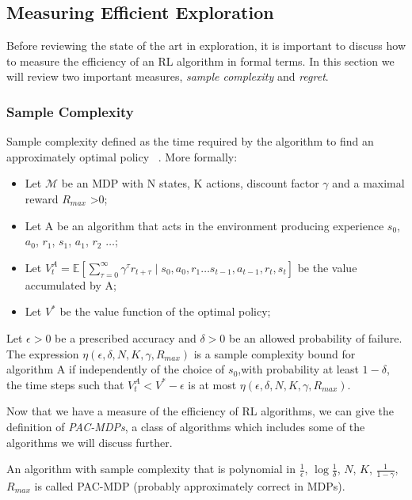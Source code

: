 \subsection{Measuring Efficient Exploration}
Before reviewing the state of the art in exploration, it is important to discuss how to measure the efficiency of an RL algorithm in formal terms. In this section we will review two important measures, \emph{sample complexity} and \emph{regret}.
\subsubsection{Sample Complexity}
Sample complexity defined as the time required by the algorithm to find an approximately optimal policy ~\cite{Gatsby2003OnTS}. More formally:
\begin{itemize}
 \item Let $\mathcal{M}$ be an MDP with N states, K actions, discount factor $\gamma$ and a maximal reward $R_{max}$ >0;
 \item Let A be an algorithm that acts in the environment producing experience $s_0$, $a_0$, $r_1$, $s_1$, $a_1$, $r_2$ $\ldots$;
 \item Let $V^{A}_t=\mathbb{E} \left[ \sum_{\tau =0}^{\infty} \gamma^\tau r_{t+\tau} \mid s_0,a_0,r_1 \ldots s_{t-1},a_{t-1},r_t,s_t \right]$ be the value accumulated by A;
 \item Let $V^*$ be the value function of the optimal policy;
\end{itemize}
\begin{definition}
	Let $\epsilon > 0 $ be a prescribed accuracy and $\delta > 0$ be an allowed probability of failure. The expression $\eta(\epsilon,\delta,N,K,\gamma,R_{max})$ is a sample complexity bound for algorithm A if independently of the choice of $s_0$,with probability at least $1-\delta$, the time steps such that $V^{A}_t < V^* - \epsilon$ is at most $\eta(\epsilon,\delta,N,K,\gamma,R_{max})$.
\end{definition}
Now that we have a measure of the efficiency of RL algorithms, we can give the definition of \emph{PAC-MDPs}, a class of algorithms which includes some of the algorithms we will discuss further.
\begin{definition}
An algorithm with sample complexity that is polynomial in $\frac{1}{\epsilon}$, $\log\frac{1}{\delta}$, $N$, $K$, $\frac{1}{1-\gamma}$, $R_{max}$ is called PAC-MDP (probably approximately correct in MDPs).
\end{definition}
